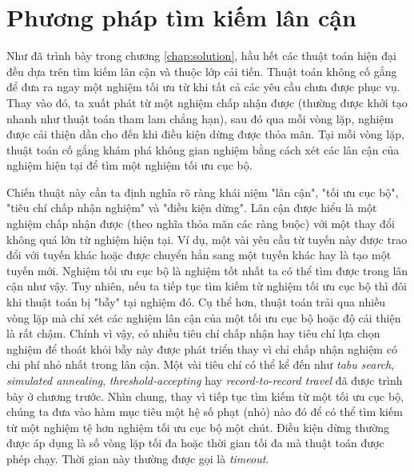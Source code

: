 \chapter{Phương pháp tìm kiếm lân cận}
\label{chap:search}

Như đã trình bày trong chương \ref{chap:solution}, hầu hết các thuật toán hiện đại đều dựa trên tìm kiếm lân cận và thuộc lớp cải tiến. Thuật toán không cố gắng để đưa ra ngay một nghiệm tối ưu từ khi tất cả các yêu cầu chưa được phục vụ. Thay vào đó, ta xuất phát từ một nghiệm chấp nhận được (thường được khởi tạo nhanh như thuật toán tham lam chẳng hạn), sau đó qua mỗi vòng lặp, nghiệm được cải thiện dần cho đến khi điều kiện dừng được thỏa mãn. Tại mỗi vòng lặp, thuật toán cố gắng khám phá không gian nghiệm bằng cách xét các lân cận của nghiệm hiện tại để tìm một nghiệm tối ưu cục bộ. 

Chiến thuật này cần ta định nghĩa rõ ràng khái niệm "lân cận", "tối ưu cục bộ", "tiêu chí chấp nhận nghiệm" và "điều kiện dừng". Lân cận được hiểu là một nghiệm chấp nhận được (theo nghĩa thỏa mãn các ràng buộc) với một thay đổi không quá lớn từ nghiệm hiện tại. Ví dụ, một vài yêu cầu từ tuyến này được trao đổi với tuyến khác hoặc được chuyển hẳn sang một tuyến khác hay là tạo một tuyến mới. Nghiệm tối ưu cục bộ là nghiệm tốt nhất ta có thể tìm được trong lân cận như vậy. Tuy nhiên, nếu ta tiếp tục tìm kiếm từ nghiệm tối ưu cục bộ thì đôi khi thuật toán bị "bẫy" tại nghiệm đó. Cụ thể hơn, thuật toán trải qua nhiều vòng lặp mà chỉ xét các nghiệm lân cận của một tối ưu cục bộ hoặc độ cải thiện là rất chậm. Chính vì vậy, có nhiều tiêu chí chấp nhận hay tiêu chí lựa chọn nghiệm để thoát khỏi bẫy này được phát triển thay vì chỉ chấp nhận nghiệm có chi phí nhỏ nhất trong lân cận. Một vài tiêu chí có thể kể đến như \textit{tabu search}, \textit{simulated annealing}, \textit{threshold-accepting} hay \textit{record-to-record travel} đã được trình bày ở chương trước. Nhìn chung, thay vì tiếp tục tìm kiếm từ một tối ưu cục bộ, chúng ta đưa vào hàm mục tiêu một hệ số phạt (nhỏ) nào đó để có thể tìm kiếm từ một nghiệm tệ hơn nghiệm tối ưu cục bộ một chút. Điều kiện dừng thường được áp dụng là số vòng lặp tối đa hoặc thời gian tối đa mà thuật toán được phép chạy. Thời gian này thường được gọi là \textit{timeout}.


